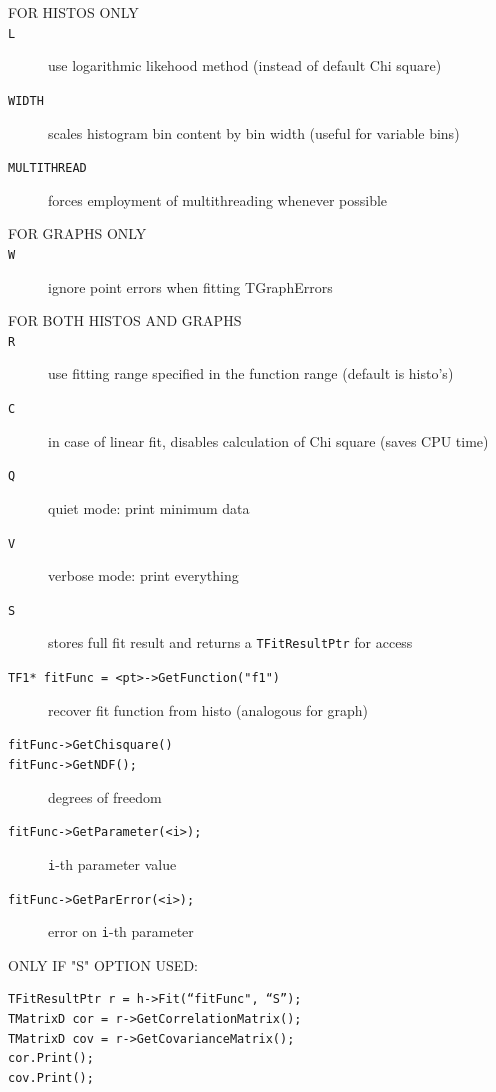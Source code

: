 \documentclass[10pt, twoside]{article}
\newcommand{\ttt}[1]{\colorbox{boxgray}{\texttt{#1}}}
\begin{document}
\begin{description}
\item[FOR HISTOS ONLY]
\item[\ttt{L}] use logarithmic likehood method (instead of default Chi square)

\item[\ttt{WIDTH}] scales histogram bin content by bin width (useful for variable bins)
\item[\ttt{MULTITHREAD}] forces employment of multithreading whenever possible
\item[FOR GRAPHS ONLY]
\item[\ttt{W}] ignore point errors when fitting TGraphErrors
\item[FOR BOTH HISTOS AND GRAPHS]
\item[\ttt{R}] use fitting range specified in the function range (default is histo's)
\item[\ttt{C}] in case of linear fit, disables calculation of Chi square (saves CPU time)
\item[\ttt{Q}] quiet mode: print minimum data
\item[\ttt{V}] verbose mode: print everything
\item[\ttt{S}] stores full fit result and returns a \ttt{TFitResultPtr} for access
\end{description}

\begin{description}
\item[\ttt{TF1* fitFunc = <pt>->GetFunction("f1")}] recover fit function from histo (analogous for graph)
\item[\ttt{fitFunc->GetChisquare()}]
\item[\ttt{fitFunc->GetNDF();}] degrees of freedom
\item[\ttt{fitFunc->GetParameter(<i>);}] \ttt{i}-th parameter value
\item[\ttt{fitFunc->GetParError(<i>);}] error on \ttt{i}-th parameter
\item[ONLY IF "S" OPTION USED:]
\end{description}
\begin{verbatim}
TFitResultPtr r = h->Fit(“fitFunc", “S”); 
TMatrixD cor = r->GetCorrelationMatrix();
TMatrixD cov = r->GetCovarianceMatrix();
cor.Print();
cov.Print();
\end{verbatim}
\end{document}
